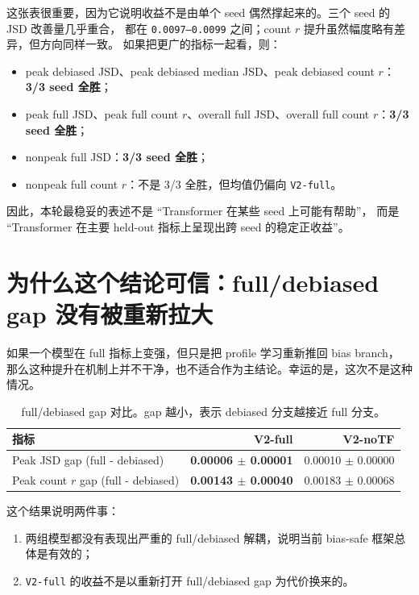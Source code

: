 \documentclass[11pt,a4paper]{ctexart}
\begin{document}
这张表很重要，因为它说明收益不是由单个 seed 偶然撑起来的。三个 seed 的 JSD 改善量几乎重合，
都在 \texttt{0.0097--0.0099} 之间；count $r$ 提升虽然幅度略有差异，但方向同样一致。
如果把更广的指标一起看，则：
\begin{itemize}[leftmargin=2em]
  \item peak debiased JSD、peak debiased median JSD、peak debiased count $r$：\textbf{3/3 seed 全胜}；
  \item peak full JSD、peak full count $r$、overall full JSD、overall full count $r$：\textbf{3/3 seed 全胜}；
  \item nonpeak full JSD：\textbf{3/3 seed 全胜}；
  \item nonpeak full count $r$：不是 3/3 全胜，但均值仍偏向 \texttt{V2-full}。
\end{itemize}

因此，本轮最稳妥的表述不是 ``Transformer 在某些 seed 上可能有帮助''，
而是 ``Transformer 在主要 held-out 指标上呈现出跨 seed 的稳定正收益''。

\section{为什么这个结论可信：full/debiased gap 没有被重新拉大}

如果一个模型在 full 指标上变强，但只是把 profile 学习重新推回 bias branch，
那么这种提升在机制上并不干净，也不适合作为主结论。幸运的是，这次不是这种情况。

\begin{table}[H]
\centering
\small
\caption{full/debiased gap 对比。gap 越小，表示 debiased 分支越接近 full 分支。}
\begin{tabular}{lrr}
\toprule
指标 & V2-full & V2-noTF \\
\midrule
Peak JSD gap (full - debiased) & \textbf{0.00006 $\pm$ 0.00001} & 0.00010 $\pm$ 0.00000 \\
Peak count $r$ gap (full - debiased) & \textbf{0.00143 $\pm$ 0.00040} & 0.00183 $\pm$ 0.00068 \\
\bottomrule
\end{tabular}
\end{table}

这个结果说明两件事：
\begin{enumerate}[leftmargin=2em]
  \item 两组模型都没有表现出严重的 full/debiased 解耦，说明当前 bias-safe 框架总体是有效的；
  \item \texttt{V2-full} 的收益不是以重新打开 full/debiased gap 为代价换来的。
\end{enumerate}
\end{document}
